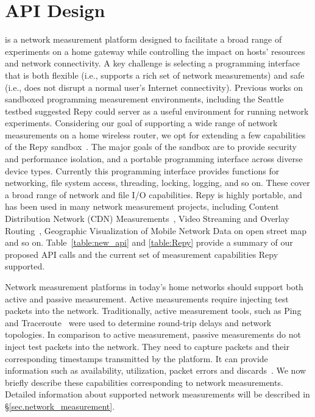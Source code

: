\section{API Design}
{\raggedright
\sysname is a network measurement platform designed to facilitate a broad range of experiments on a home gateway while controlling the impact on hosts' resources and network connectivity. A key challenge is selecting a programming interface that is both flexible (i.e., supports a rich set of network measurements) and safe (i.e., does not disrupt a normal user's Internet connectivity). Previous works on sandboxed programming measurement environments, including the Seattle testbed suggested Repy could server as a useful environment for running network experiments. Considering our goal of supporting a wide range of network measurements on a home wireless router, we opt for extending a few capabilities of the Repy sandbox~\cite{cappos2010retaining}. The major goals of the sandbox are to provide security and performance isolation, and a portable programming interface across diverse device types. Currently this programming interface provides functions for networking, file system access, threading, locking, logging, and so on. These cover a broad range of network and file I/O capabilities. Repy is highly portable, and has been used in many network measurement projects, including Content Distribution Network (CDN) Measurements~\cite{rafetseder2011exploring}, Video Streaming and Overlay Routing~\cite{eisl2011service}, Geographic Visualization of Mobile Network Data on open street map~\cite{open3gmap} and so on. Table~\ref{table:new_api} and \ref{table:Repy} provide a summary of our proposed API calls and the current set of measurement capabilities Repy supported. 

Network measurement platforms in today's home networks should support both active and passive measurement. Active measurements require injecting test packets into the network. Traditionally, active measurement tools, such as Ping~\cite{ping} and Traceroute~\cite{traceroute} were used to determine round-trip delays and network topologies. In comparison to active measurement, passive measurements do not inject test packets into the network. They need to capture packets and their corresponding timestamps transmitted by the platform. It can provide information such as availability, utilization, packet errors and discards~\cite{calyamactive}. We now briefly describe these capabilities corresponding to network measurements. Detailed information about supported network measurements will be described in \S{\ref{sec.network_measurement}}.

}
